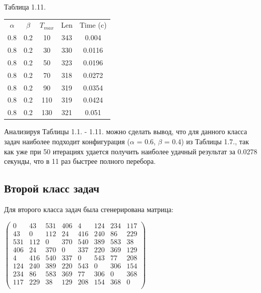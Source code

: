 \documentclass[12pt]{report}
\begin{document}
	\begin{center}
		Таблица 1.11.
		
		\begin{tabular}{|c c c c c|}
			\hline
			$\alpha$ & $\beta$ & $T_{max}$ & Len & Time (c) \\ [0.5ex]
			0.8 & 0.2 & 10 & 343 & 0.004 \\ 
			\hline 
			0.8 & 0.2 & 30 & 330 & 0.0116 \\ 
			\hline 
			0.8 & 0.2 & 50 & 323 & 0.0196 \\ 
			\hline 
			0.8 & 0.2 & 70 & 318 & 0.0272 \\ 
			\hline 
			0.8 & 0.2 & 90 & 319 & 0.0354 \\ 
			\hline 
			0.8 & 0.2 & 110 & 319 & 0.0424 \\ 
			\hline 
			0.8 & 0.2 & 130 & 321 & 0.051 \\ 
			\hline 
		\end{tabular}
	\end{center}
		
	Анализируя Таблицы 1.1. - 1.11. можно сделать вывод, что для данного класса задач наиболее подходит конфигурация ($\alpha$ = 0.6, $\beta$ = 0.4) из Таблицы 1.7., так как уже при 50 итерациях удается получить наиболее удачный результат за 0.0278 секунды, что в 11 раз быстрее полного перебора.
	
	
	\subsection{Второй класс задач}
	
	Для второго класса задач была сгенерирована матрица:
	\begin{center}
		$
		\begin{pmatrix}
		0 & 43 & 531 & 406 & 4 & 124 & 234 & 117 \\
		43 & 0 & 112 & 24 & 416 & 240 & 86 & 229 \\
		531 & 112 & 0 & 370 & 540 & 389 & 583 & 38 \\
		406 & 24 & 370 & 0 & 337 & 220 & 369 & 129 \\
		4 & 416 & 540 & 337 & 0 & 543 & 77 & 208 \\
		124 & 240 & 389 & 220 & 543 & 0 & 306 & 154 \\ 
		234 & 86 & 583 & 369 & 77 & 306 & 0 & 368 \\
		117 & 229 & 38 & 129 & 208 & 154 & 368 & 0 \\
		\end{pmatrix}
		$
	\end{center}                 
\end{document}
